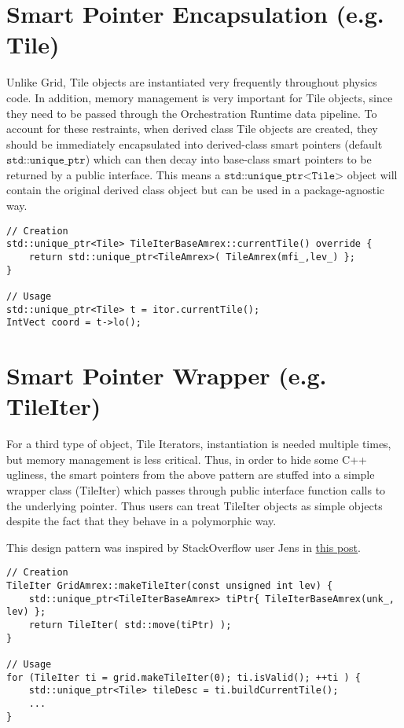 \documentclass[letterpaper,12pt]{article}
\begin{document}
\section{Smart Pointer Encapsulation (e.g. Tile)}

Unlike Grid, Tile objects are instantiated very frequently throughout physics code. In addition, memory management is very important for Tile objects, since they need to be passed through the Orchestration Runtime data pipeline. To account for these restraints, when derived class Tile objects are created, they should be immediately encapsulated into derived-class smart pointers (default $\texttt{std::unique\_ptr}$) which can then decay into base-class smart pointers to be returned by a public interface. This means a $\texttt{std::unique\_ptr<Tile>}$ object will contain the original derived class object but can be used in a package-agnostic way.

\begin{verbatim}
// Creation
std::unique_ptr<Tile> TileIterBaseAmrex::currentTile() override {
    return std::unique_ptr<TileAmrex>( TileAmrex(mfi_,lev_) };
}

// Usage
std::unique_ptr<Tile> t = itor.currentTile();
IntVect coord = t->lo();
\end{verbatim}

\section{Smart Pointer Wrapper (e.g. TileIter) }

For a third type of object, Tile Iterators,  instantiation is needed multiple times, but memory management is less critical. Thus, in order to hide some C++ ugliness, the smart pointers from the above pattern are stuffed into a simple wrapper class (TileIter) which passes through public interface function calls to the underlying pointer. Thus users can treat TileIter objects as simple objects despite the fact that they behave in a polymorphic way.

This design pattern was inspired by StackOverflow user Jens in \href{https://stackoverflow.com/a/38011637}{this post}.

\begin{verbatim}
// Creation
TileIter GridAmrex::makeTileIter(const unsigned int lev) {
    std::unique_ptr<TileIterBaseAmrex> tiPtr{ TileIterBaseAmrex(unk_, lev) };
    return TileIter( std::move(tiPtr) );
}

// Usage
for (TileIter ti = grid.makeTileIter(0); ti.isValid(); ++ti ) {
    std::unique_ptr<Tile> tileDesc = ti.buildCurrentTile();
    ...
}


\end{verbatim}
\end{document}
